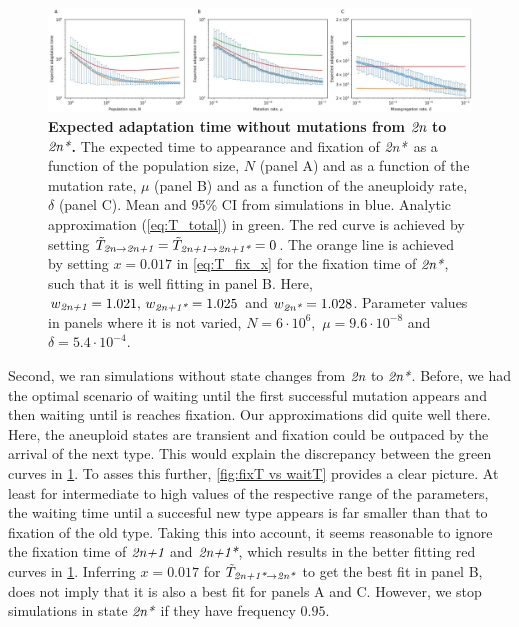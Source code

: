 \documentclass[12pt]{extarticle}
\newcommand{\euwt}{\emph{2n}}
\newcommand{\anwt}{\emph{2n+1}}
\newcommand{\eumt}{\emph{2n*}}
\newcommand{\anmt}{\emph{2n+1*}}
\begin{document}
 
 \begin{figure}[h!]
 \includegraphics[width=1\textwidth]{../figures/figgrid_nodirectmut_ylog_uncorr0.jpg}
 \caption{\textbf{Expected adaptation time without mutations from $\euwt$ to $\eumt$.}
  The expected time to appearance and fixation of \eumt\ as a function of the population size, $N$ (panel A) and as a function of the mutation rate, $\mu$ (panel B) and as a function of the aneuploidy rate, $\delta$ (panel C). Mean and 95\% CI from simulations in blue. Analytic approximation (\cref{eq:T_total}) in green. The red curve is achieved by setting $\tilde{T}_{\euwt \rightarrow \anwt}=\tilde{T}_{\anwt \rightarrow \anmt}=0$. The orange line is achieved by setting $x=0.017$ in \cref{eq:T_fix_x} for the fixation time of $\eumt$, such that it is well fitting in panel B. Here, $w_\anwt=1.021,\,   w_\anmt=1.025$ and $w_\eumt=1.028$. Parameter values in panels where it is not varied, $N=6\cdot 10^6$,\, $\mu=9.6\cdot 10^{-8}$ and $\delta=5.4\cdot 10^{-4}$.  }
 \label{fig:no direct mut}
 \end{figure}
 
 Second, we ran simulations without state changes from $\euwt$ to $\eumt$. Before, we had the optimal scenario of waiting until the first successful mutation appears and then waiting until is reaches fixation. Our approximations did quite well there. Here, the aneuploid states are transient and fixation could be outpaced by the arrival of the next type. This would explain the discrepancy between the green curves in \cref{fig:no direct mut}. To asses this further, \cref{fig:fixT vs waitT} provides a clear picture. At least for intermediate to high values of the respective range of the parameters, the waiting time until a succesful new type appears is far smaller than that to fixation of the old type. Taking this into account, it seems reasonable to ignore the fixation time of $\anwt$ and $\anmt$, which results in the better fitting red curves in \cref{fig:no direct mut}. Inferring $x=0.017$ for $\tilde{T}_{\anmt \rightarrow \eumt}$ to get the best fit in panel B, does not imply that it is also a best fit for panels A and C. However, we stop simulations in state $\eumt$ if they have frequency $0.95$. 
 
\end{document}
